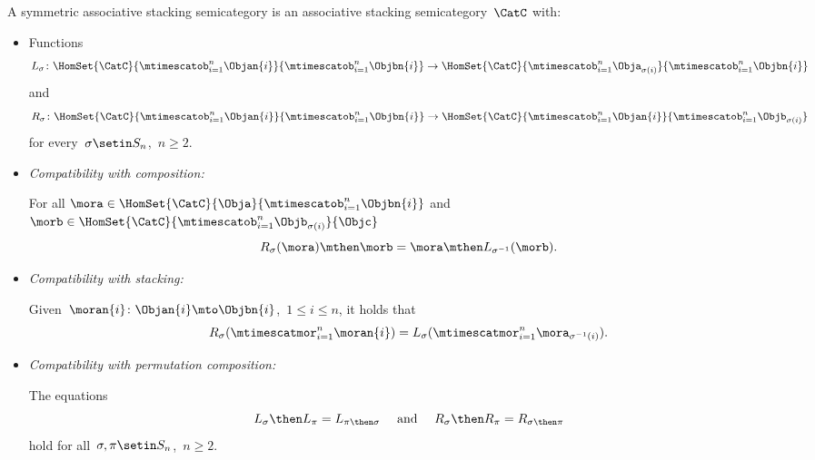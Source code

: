 \begin{ctdefinition}
    \label{def:symmetric-stacking-category}
    A symmetric associative stacking semicategory is an associative stacking semicategory~$\CatC$ with:

    \constit

    \begin{itemize}
        \item Functions
              \begin{equation}
                  L_\sigma \colon \HomSet{\CatC}{\mtimescatob_{i=1}^n \Objan{i}}{\mtimescatob_{i=1}^n \Objbn{i}} \to \HomSet{\CatC}{\mtimescatob_{i=1}^n \Obja_{\sigma(i)}}{\mtimescatob_{i=1}^n \Objbn{i}}
              \end{equation}
              and
              \begin{equation}
                  R_\sigma \colon \HomSet{\CatC}{\mtimescatob_{i=1}^n \Objan{i}}{\mtimescatob_{i=1}^n \Objbn{i}} \to \HomSet{\CatC}{\mtimescatob_{i=1}^n \Objan{i}}{\mtimescatob_{i=1}^n \Objb_{\sigma(i)}}
              \end{equation}
              for every~$\sigma \setin S_n$,~$n \geq 2$.
    \end{itemize}

    \condit

    \begin{itemize}

        \item \emph{Compatibility with composition:}

              For all $\mora \in \HomSet{\CatC}{\Obja}{\mtimescatob_{i=1}^n \Objbn{i}}$ and $\morb \in \HomSet{\CatC}{\mtimescatob_{i=1}^n \Objb_{\sigma(i)}}{\Objc}$
              \begin{equation}
                  R_\sigma (\mora) \mthen \morb = \mora \mthen L_{\sigma^{-1}}(\morb).
              \end{equation}

        \item \emph{Compatibility with stacking:}

              Given~$\moran{i} \colon \Objan{i} \mto \Objbn{i}$,~$1 \leq i \leq n$, it holds that
              \begin{equation}
                  R_\sigma ( \mtimescatmor_{i=1}^n \moran{i} ) = L_\sigma(  \mtimescatmor_{i=1}^n \mora_{\sigma^{-1}(i)} ).
              \end{equation}

        \item \emph{Compatibility with permutation composition:}

              The equations
              \begin{equation}
                  L_\sigma \then L_\pi = L_{\pi \then \sigma}
                  \quad \text{ and } \quad
                  R_\sigma \then R_\pi = R_{\sigma \then \pi}
              \end{equation}
              hold for all~$\sigma, \pi \setin S_n$,~$n \geq 2$.

    \end{itemize}
\end{ctdefinition}

